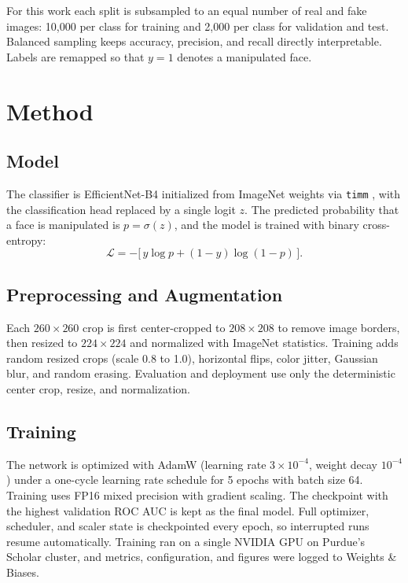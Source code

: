 \documentclass[11pt]{article}
\begin{document}
For this work each split is subsampled to an equal number of real and fake images: 10,000 per class for training and 2,000 per class for validation and test. Balanced sampling keeps accuracy, precision, and recall directly interpretable. Labels are remapped so that $y=1$ denotes a manipulated face.

\section{Method}

\subsection{Model}

The classifier is EfficientNet-B4 \cite{efficientnet} initialized from ImageNet weights via \texttt{timm} \cite{timm}, with the classification head replaced by a single logit $z$. The predicted probability that a face is manipulated is $p = \sigma(z)$, and the model is trained with binary cross-entropy:
\begin{equation}
\mathcal{L} = -\big[\, y \log p + (1-y)\log(1-p) \,\big].
\end{equation}

\subsection{Preprocessing and Augmentation}

Each $260\times260$ crop is first center-cropped to $208\times208$ to remove image borders, then resized to $224\times224$ and normalized with ImageNet statistics. Training adds random resized crops (scale 0.8 to 1.0), horizontal flips, color jitter, Gaussian blur, and random erasing. Evaluation and deployment use only the deterministic center crop, resize, and normalization.

\subsection{Training}

The network is optimized with AdamW (learning rate $3\times10^{-4}$, weight decay $10^{-4}$) under a one-cycle learning rate schedule for 5 epochs with batch size 64. Training uses FP16 mixed precision with gradient scaling. The checkpoint with the highest validation ROC AUC is kept as the final model. Full optimizer, scheduler, and scaler state is checkpointed every epoch, so interrupted runs resume automatically. Training ran on a single NVIDIA GPU on Purdue's Scholar cluster, and metrics, configuration, and figures were logged to Weights \& Biases.
\end{document}
